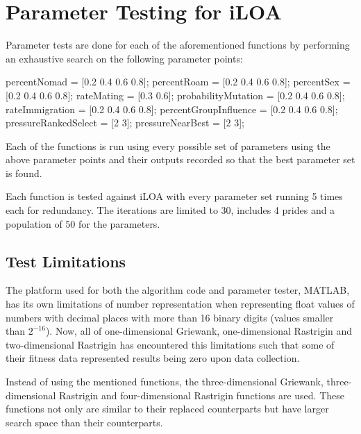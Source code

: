 \section{Parameter Testing for iLOA}

\par Parameter tests are done for each of the aforementioned functions by performing an exhaustive search on the following parameter points:

percentNomad = [0.2 0.4 0.6 0.8];
percentRoam = [0.2 0.4 0.6 0.8];
percentSex = [0.2 0.4 0.6 0.8];
rateMating = [0.3 0.6];
probabilityMutation = [0.2 0.4 0.6 0.8];
rateImmigration = [0.2 0.4 0.6 0.8];
percentGroupInfluence = [0.2 0.4 0.6 0.8];
pressureRankedSelect = [2 3];
pressureNearBest = [2 3];

\par Each of the functions is run using every possible set of parameters using the above parameter points and their outputs recorded so that the best parameter set is found.

\par Each function is tested against iLOA with every parameter set running 5 times each for redundancy. The iterations are limited to 30, includes 4 prides and a population of 50 for the parameters.

\subsection{Test Limitations}
\par The platform used for both the algorithm code and parameter tester, MATLAB, has its own limitations of number representation when representing float values of numbers with decimal places with more than 16 binary digits (values smaller than $2^{-16}$). Now, all of one-dimensional Griewank, one-dimensional Rastrigin and two-dimensional Rastrigin has encountered this limitations such that some of their fitness data represented results being zero upon data collection.

\par Instead of using the mentioned functions, the three-dimensional Griewank, three-dimensional Rastrigin and four-dimensional Rastrigin functions are used. These functions not only are similar to their replaced counterparts but have larger search space than their counterparts.
